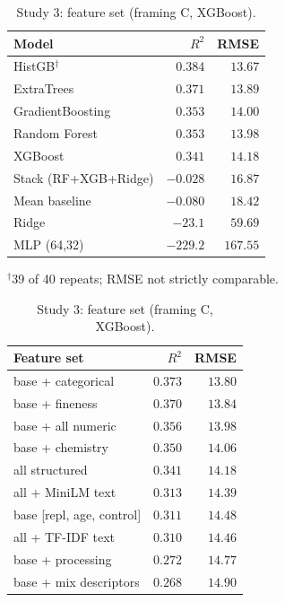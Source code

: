 \documentclass[11pt]{article}
\newcommand{\R}{$R^2$}
\begin{document}
\begin{table}[H]\centering\small
\begin{minipage}{0.46\textwidth}\centering
\caption{Study 2: model (framing C, all features).}
\label{tab:s2}
\begin{tabular}{lrr}
\toprule
Model & \R{} & RMSE \\
\midrule
\rowcolor{green!12}HistGB$^{\dagger}$ & $0.384$ & $13.67$ \\
ExtraTrees & $0.371$ & $13.89$ \\
GradientBoosting & $0.353$ & $14.00$ \\
Random Forest & $0.353$ & $13.98$ \\
XGBoost & $0.341$ & $14.18$ \\
Stack (RF+XGB+Ridge) & $-0.028$ & $16.87$ \\
Mean baseline & $-0.080$ & $18.42$ \\
Ridge & $-23.1$ & $59.69$ \\
MLP (64,32) & $-229.2$ & $167.55$ \\
\bottomrule
\end{tabular}

{\scriptsize $^{\dagger}$39 of 40 repeats; RMSE not strictly comparable.}
\end{minipage}\hfill
\begin{minipage}{0.5\textwidth}\centering
\caption{Study 3: feature set (framing C, XGBoost).}
\label{tab:s3}
\begin{tabular}{lrr}
\toprule
Feature set & \R{} & RMSE \\
\midrule
\rowcolor{green!12}base + categorical & $0.373$ & $13.80$ \\
base + fineness & $0.370$ & $13.84$ \\
base + all numeric & $0.356$ & $13.98$ \\
base + chemistry & $0.350$ & $14.06$ \\
all structured & $0.341$ & $14.18$ \\
all + MiniLM text & $0.313$ & $14.39$ \\
base [repl, age, control] & $0.311$ & $14.48$ \\
all + TF-IDF text & $0.310$ & $14.46$ \\
base + processing & $0.272$ & $14.77$ \\
base + mix descriptors & $0.268$ & $14.90$ \\
\bottomrule
\end{tabular}
\end{minipage}
\end{table}
\end{document}
